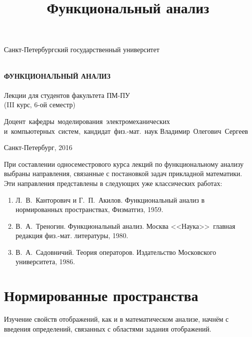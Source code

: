\documentclass[12pt,a4paper,titlepage,oneside]{book}
\title{Функциональный анализ}
\theoremstyle{definition}
\theoremstyle{plain}
\theoremstyle{remark}
\theoremstyle{remark}
\theoremstyle{remark}
\theoremstyle{remark}
\theoremstyle{plain}
\theoremstyle{plain}
\begin{document}
\begin{titlepage}
\begin{center}

\vfill

Санкт-Петербургский государственный университет\\
\ \\

\vfill

{\large\bf ФУНКЦИОНАЛЬНЫЙ АНАЛИЗ\\}
\ \\
Лекции для студентов факультета ПМ-ПУ\\
(III курс, 6-ой семестр)

\vfill

\hfill\vbox
{
\hbox{Доцент кафедры моделирования электромеханических}
\hbox{и компьютерных систем, кандидат физ.-мат. наук}
\hbox{Владимир Олегович Сергеев}
}

\vfill

Санкт-Петербург, 2016
\end{center}
\end{titlepage}

\tableofcontents

\vfill

\begin{small}
При составлении односеместрового курса лекций по функциональному анализу выбраны направления, связанные с постановкой задач прикладной математики. Эти направления представлены в следующих уже классических работах:
\begin{enumerate}
    \item Л.~В.~Канторович и Г.~П.~Акилов. Функциональный анализ в нормированных пространствах, Физматгиз, 1959.
    \item В.~А.~Треногин. Функциональный анализ. Москва <<Наука>>\, главная редакция физ.-мат. литературы, 1980.
    \item В.~А.~Садовничий. Теория операторов. Издательство Московского университета, 1986.
\end{enumerate}
\end{small}

\chapter{Нормированные пространства}

Изучение свойств отображений, как и в математическом анализе, начнём с введения определений, связанных с областями задания отображений.
\end{document}
